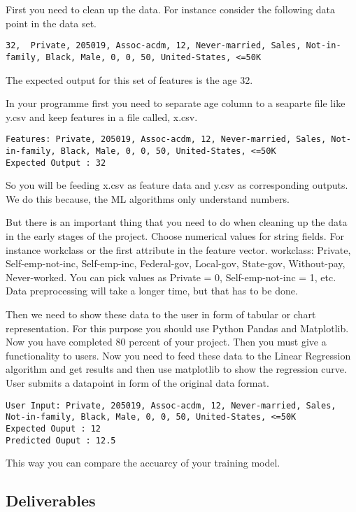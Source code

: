 First you need to clean up the data. For instance consider the following data point in the data set. 

\begin{lstlisting}
32,  Private, 205019, Assoc-acdm, 12, Never-married, Sales, Not-in-family, Black, Male, 0, 0, 50, United-States, <=50K
\end{lstlisting}

The expected output for this set of features is the age 32.

In your programme first you need to separate age column to a seaparte
file like y.csv and keep features in a file called, x.csv.
\begin{lstlisting}
Features: Private, 205019, Assoc-acdm, 12, Never-married, Sales, Not-in-family, Black, Male, 0, 0, 50, United-States, <=50K
Expected Output : 32
\end{lstlisting}

So you will be feeding x.csv as feature data and y.csv as
corresponding outputs. We do this because, the ML algorithms only
understand numbers.

But there is an important thing that you need to do when cleaning up
the data in the early stages of the project. Choose numerical values
for string fields.  For instance workclass or the first attribute in
the feature vector.  workclass: Private, Self-emp-not-inc,
Self-emp-inc, Federal-gov, Local-gov, State-gov, Without-pay,
Never-worked.  You can pick values as Private = 0, Self-emp-not-inc =
1, etc. Data preprocessing will take a longer time, but that has to be done. 


Then we need to show these data to the user in form of tabular or
chart representation. For this purpose you should use Python Pandas
and Matplotlib.  Now you have completed 80 percent of your
project. Then you must give a functionality to users. Now you need to
feed these data to the Linear Regression algorithm and get results and
then use matplotlib to show the regression curve. User submits a datapoint
in form of the original data format.

\begin{lstlisting}
User Input: Private, 205019, Assoc-acdm, 12, Never-married, Sales, Not-in-family, Black, Male, 0, 0, 50, United-States, <=50K
Expected Ouput : 12
Predicted Ouput : 12.5
\end{lstlisting}

This way you can compare the accuarcy of your training model.


\subsection{Deliverables}

